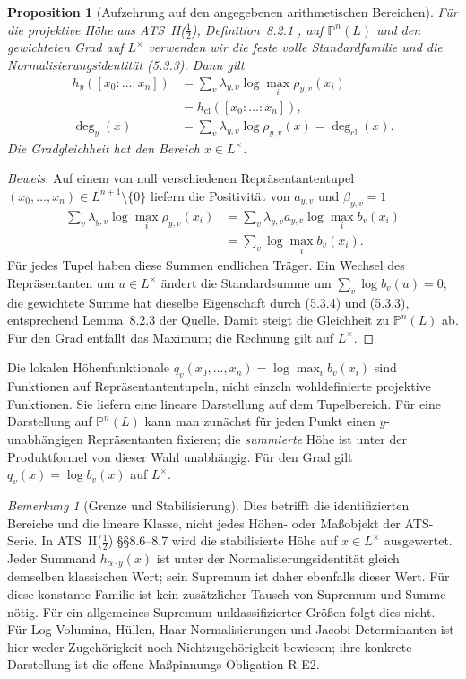 \documentclass[11pt,a4paper]{article}
\newtheorem{proposition}[theorem]{Proposition}
\theoremstyle{definition}
\theoremstyle{remark}
\newtheorem{remark}[theorem]{Bemerkung}
\begin{document}
\begin{proposition}[Aufzehrung auf den angegebenen arithmetischen Bereichen]\label{prop:exhaustion}
Für die projektive Höhe aus ATS~II($\tfrac12$), Definition~8.2.1
\cite{joshiIIhalf}, auf $\mathbb P^n(L)$ und den gewichteten Grad auf
$L^\times$ verwenden wir die feste volle Standardfamilie und die
Normalisierungsidentität (5.3.3). Dann gilt
\begin{align*}
h_y([x_0:\dots:x_n])
&=\sum_v\lambda_{y,v}\log\max_i\rho_{y,v}(x_i)\\
&=h_{\mathrm{cl}}([x_0:\dots:x_n]),\\
\deg_y(x)&=\sum_v\lambda_{y,v}\log\rho_{y,v}(x)
=\deg_{\mathrm{cl}}(x).
\end{align*}
Die Gradgleichheit hat den Bereich $x\in L^\times$.
\end{proposition}

\begin{proof}[Beweis]
Auf einem von null verschiedenen Repräsentantentupel
$(x_0,\dots,x_n)\in L^{n+1}\setminus\{0\}$ liefern die Positivität von
$a_{y,v}$ und $\beta_{y,v}=1$
\begin{align*}
\sum_v\lambda_{y,v}\log\max_i\rho_{y,v}(x_i)
&=\sum_v\lambda_{y,v}a_{y,v}\log\max_i b_v(x_i)\\
&=\sum_v\log\max_i b_v(x_i).
\end{align*}
Für jedes Tupel haben diese Summen endlichen Träger. Ein Wechsel des
Repräsentanten um $u\in L^\times$ ändert die Standardsumme um
$\sum_v\log b_v(u)=0$; die gewichtete Summe hat dieselbe Eigenschaft durch
(5.3.4) und (5.3.3), entsprechend Lemma~8.2.3 der Quelle.
Damit steigt die Gleichheit zu $\mathbb P^n(L)$ ab.
Für den Grad entfällt das Maximum; die Rechnung gilt auf $L^\times$.
\end{proof}

Die lokalen Höhenfunktionale
$q_v(x_0,\dots,x_n)=\log\max_i b_v(x_i)$ sind Funktionen auf
Repräsentantentupeln, nicht einzeln wohldefinierte projektive Funktionen.
Sie liefern eine lineare Darstellung auf dem Tupelbereich.
Für eine Darstellung auf $\mathbb P^n(L)$ kann man zunächst für jeden Punkt
einen $y$-unabhängigen Repräsentanten fixieren; die \emph{summierte} Höhe
ist unter der Produktformel von dieser Wahl unabhängig.
Für den Grad gilt $q_v(x)=\log b_v(x)$ auf $L^\times$.

\begin{remark}[Grenze und Stabilisierung]\label{rem:boundary}
Dies betrifft die identifizierten Bereiche und die lineare Klasse, nicht
jedes Höhen- oder Maßobjekt der ATS-Serie.
In ATS~II($\tfrac12$) \S\S8.6--8.7 wird die stabilisierte Höhe auf
$x\in L^\times$ ausgewertet. Jeder Summand $h_{\alpha\cdot y}(x)$ ist
unter der Normalisierungsidentität gleich demselben klassischen Wert;
sein Supremum ist daher ebenfalls dieser Wert. Für diese konstante Familie
ist kein zusätzlicher Tausch von Supremum und Summe nötig.
Für ein allgemeines Supremum unklassifizierter Größen folgt dies nicht.
Für Log-Volumina, Hüllen, Haar-Normalisierungen und Jacobi-Determinanten
ist hier weder Zugehörigkeit noch Nichtzugehörigkeit bewiesen; ihre
konkrete Darstellung ist die offene Maßpinnungs-Obligation R-E2.
\end{remark}
\end{document}
